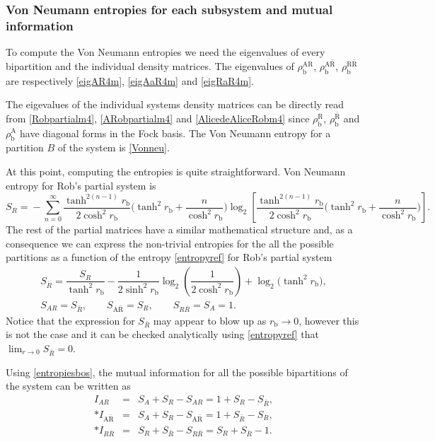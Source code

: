\subsubsection{Von Neumann entropies for each subsystem and mutual information}

To compute the Von Neumann entropies we need the eigenvalues of every bipartition and the individual density matrices. The eigenvalues of $\rho^\text{AR}_\text{b}$, $\rho^{\text{A}{\bar{\text{R}}}}_\text{b}$, $\rho^{\text{R}{\bar{\text{R}}}}_\text{b}$ are respectively \eqref{eigAR4m}, \eqref{eigAaR4m} and \eqref{eigRaR4m}.

The eigevalues of the individual systems density matrices can be directly read from \eqref{Robpartialm4}, \eqref{ARobpartialm4} and \eqref{AlicedeAliceRobm4} since $\rho^\text{R}_\text{b}$, $\rho^{{\bar{\text{R}}}}_\text{b}$ and $\rho^\text{A}_\text{b}$ have diagonal forms in the Fock basis. The Von Neumann entropy for a partition $B$ of the system is \eqref{Vonneu}.

At this point, computing the entropies is quite straightforward. Von Neumann entropy for Rob's partial system is
\begin{equation}\label{entropyref}
S_R\!=\!-\sum_{n=0}^\infty\frac{\tanh^{2(n-1)}r_\text{b}}{2\cosh^2 r_\text{b}}\Big(\tanh^2 r_\text{b}+  \frac{n}{\cosh^2 r_\text{b}}\Big)\log_2\!\left[\frac{\tanh^{2(n-1)}r_\text{b}}{2\cosh^2 r_\text{b}}\Big(\tanh^2 r_\text{b} \!+\! \frac{n}{\cosh^2 r_\text{b}}\Big)\!\right].
\end{equation}
The rest of the partial matrices have a similar mathematical structure and, as a consequence we can express the non-trivial entropies for the all the possible partitions as a function of the entropy \eqref{entropyref} for Rob's partial system
\begin{eqnarray}\label{entropiesbos}
\nonumber &S_{\bar R}=\dfrac{S_R}{\tanh^2 r_\text{b}}-\dfrac{1}{2\sinh^2 r_\text{b}}\log_2\left(\dfrac{1}{2\cosh^2 r_\text{b}}\right)+\log_2\Big(\tanh^2 r_\text{b}\Big),&\\[2mm]
 &S_{AR}=S_{\bar R},\qquad \!\! S_{\text{A}{\bar{\text{R}}}}=S_{R}, \qquad \!\! S_{R\bar R}=S_{A}=1.&
\end{eqnarray} 
Notice that the expression for $S_{\bar R}$ may appear to blow up as $r_\text{b}\rightarrow0$, however this is not the case and it can be checked analytically using \eqref{entropyref} that $\lim_{r\rightarrow 0} S_{\bar R} = 0$.

Using \eqref{entropiesbos}, the mutual information for all the possible bipartitions of the system can be written as
\begin{eqnarray}
\nonumber I_{AR}&=&S_A+S_R-S_{A R}=1+S_R -S_{\bar R},\\*
\nonumber I_{\text{A}{\bar{\text{R}}}}&=&S_A+S_R-S_{\text{A}{\bar{\text{R}}}}=1+ S_{\bar R}-S_R,\\*
\nonumber I_{R\bar R}&=& S_R+S_{\bar R}-S_{R\bar R}=S_R+S_{\bar R}-1.
\end{eqnarray}  

